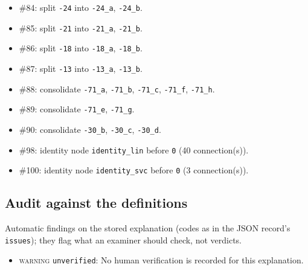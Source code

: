 \begin{drafted}
\begin{itemize}
\item \#84: split \texttt{-24} into \texttt{-24\_\allowbreak{}a}, \texttt{-24\_\allowbreak{}b}.
\item \#85: split \texttt{-21} into \texttt{-21\_\allowbreak{}a}, \texttt{-21\_\allowbreak{}b}.
\item \#86: split \texttt{-18} into \texttt{-18\_\allowbreak{}a}, \texttt{-18\_\allowbreak{}b}.
\item \#87: split \texttt{-13} into \texttt{-13\_\allowbreak{}a}, \texttt{-13\_\allowbreak{}b}.
\item \#88: consolidate \texttt{-71\_\allowbreak{}a}, \texttt{-71\_\allowbreak{}b}, \texttt{-71\_\allowbreak{}c}, \texttt{-71\_\allowbreak{}f}, \texttt{-71\_\allowbreak{}h}.
\item \#89: consolidate \texttt{-71\_\allowbreak{}e}, \texttt{-71\_\allowbreak{}g}.
\item \#90: consolidate \texttt{-30\_\allowbreak{}b}, \texttt{-30\_\allowbreak{}c}, \texttt{-30\_\allowbreak{}d}.
\item \#98: identity node \texttt{identity\_\allowbreak{}lin} before \texttt{0} (40 connection(s)).
\item \#100: identity node \texttt{identity\_\allowbreak{}svc} before \texttt{0} (3 connection(s)).
\end{itemize}
\subsection{Audit against the definitions}\label{app:churn100-s2-c1:audit}
Automatic findings on the stored explanation (codes as in the JSON record's \texttt{issues}); they flag what an examiner should check, not verdicts.
\begin{itemize}
\item \textsc{warning} \texttt{unverified}: No human verification is recorded for this explanation.
\end{itemize}
\end{drafted}

